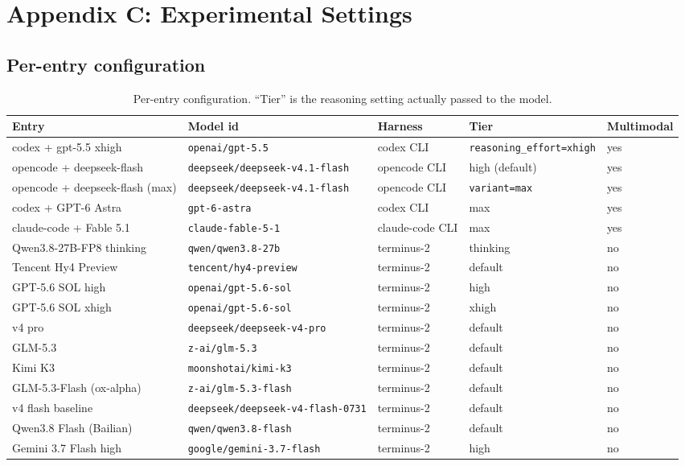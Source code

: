 \section{Appendix C: Experimental Settings}
\label{app:settings}

\subsection{Per-entry configuration}
\begin{table}[h]
\centering
\small
\caption{Per-entry configuration. ``Tier'' is the reasoning setting actually passed to the model.}
\label{tab:app-configs}
\begin{tabular}{@{}lllll@{}}
\toprule
Entry & Model id & Harness & Tier & Multimodal \\
\midrule
codex + gpt-5.5 xhigh        & \texttt{openai/gpt-5.5} & codex CLI & \texttt{reasoning\_effort=xhigh} & yes \\
opencode + deepseek-flash    & \texttt{deepseek/deepseek-v4.1-flash} & opencode CLI & high (default) & yes \\
opencode + deepseek-flash (max) & \texttt{deepseek/deepseek-v4.1-flash} & opencode CLI & \texttt{variant=max} & yes \\
codex + GPT-6 Astra          & \texttt{gpt-6-astra} & codex CLI & max & yes \\
claude-code + Fable 5.1      & \texttt{claude-fable-5-1} & claude-code CLI & max & yes \\
Qwen3.8-27B-FP8 thinking     & \texttt{qwen/qwen3.8-27b} & terminus-2 & thinking & no \\
Tencent Hy4 Preview          & \texttt{tencent/hy4-preview} & terminus-2 & default & no \\
GPT-5.6 SOL high             & \texttt{openai/gpt-5.6-sol} & terminus-2 & high & no \\
GPT-5.6 SOL xhigh            & \texttt{openai/gpt-5.6-sol} & terminus-2 & xhigh & no \\
v4 pro                       & \texttt{deepseek/deepseek-v4-pro} & terminus-2 & default & no \\
GLM-5.3                      & \texttt{z-ai/glm-5.3} & terminus-2 & default & no \\
Kimi K3                      & \texttt{moonshotai/kimi-k3} & terminus-2 & default & no \\
GLM-5.3-Flash (ox-alpha)     & \texttt{z-ai/glm-5.3-flash} & terminus-2 & default & no \\
v4 flash baseline            & \texttt{deepseek/deepseek-v4-flash-0731} & terminus-2 & default & no \\
Qwen3.8 Flash (Bailian)      & \texttt{qwen/qwen3.8-flash} & terminus-2 & default & no \\
Gemini 3.7 Flash high        & \texttt{google/gemini-3.7-flash} & terminus-2 & high & no \\
\bottomrule
\end{tabular}
\end{table}

